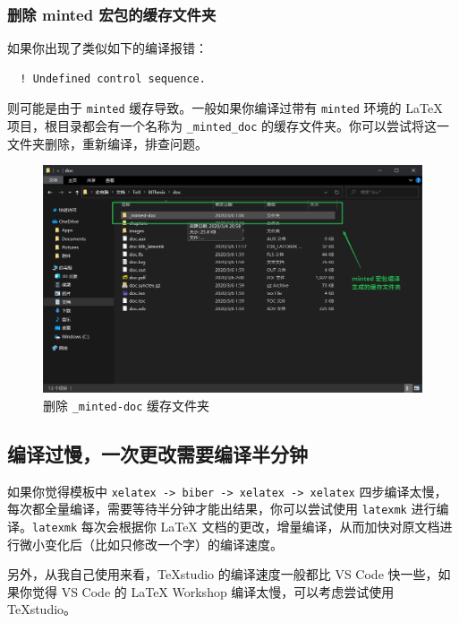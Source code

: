 \subsubsection{删除 minted 宏包的缓存文件夹}

如果你出现了类似如下的编译报错：
\begin{verbatim}
  ! Undefined control sequence.
\end{verbatim}

则可能是由于 \texttt{minted} 缓存导致。一般如果你编译过带有 \texttt{minted} 环境的 {\LaTeX} 项目，根目录都会有一个名称为 \texttt{\_minted\_doc} 的缓存文件夹。你可以尝试将这一文件夹删除，重新编译，排查问题。

\begin{figure}[H]
  \centering
  \includegraphics[width=\textwidth]{images/delete_minted_doc.png}
  \caption{删除 \texttt{\_minted-doc} 缓存文件夹}
  \label{delete_minted_doc}
\end{figure}

\subsection{编译过慢，一次更改需要编译半分钟}

如果你觉得模板中 \texttt{xelatex -> biber -> xelatex -> xelatex} 四步编译太慢，每次都全量编译，需要等待半分钟才能出结果，你可以尝试使用 \texttt{latexmk} 进行编译。\texttt{latexmk} 每次会根据你 {\LaTeX} 文档的更改，增量编译，从而加快对原文档进行微小变化后（比如只修改一个字）的编译速度。

另外，从我自己使用来看，\TeX studio 的编译速度一般都比 VS Code 快一些，如果你觉得 VS Code 的 LaTeX Workshop 编译太慢，可以考虑尝试使用 \TeX studio。

